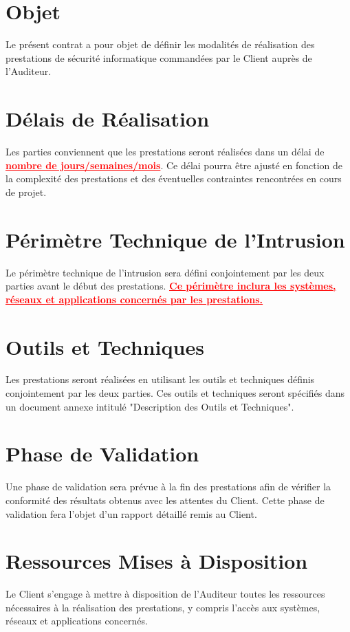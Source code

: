 \documentclass[12pt]{extarticle}
\begin{document}
\section{Objet}
Le présent contrat a pour objet de définir les modalités de réalisation des prestations de sécurité informatique commandées par le Client auprès de l'Auditeur.
\section{Délais de Réalisation}
Les parties conviennent que les prestations seront réalisées dans un délai de \textcolor{red}{\textbf{\underline{nombre de jours/semaines/mois}}}. Ce délai pourra être ajusté en fonction de la complexité des prestations et des éventuelles contraintes rencontrées en cours de projet.
\section{Périmètre Technique de l’Intrusion}
Le périmètre technique de l'intrusion sera défini conjointement par les deux parties avant le début des prestations. \textcolor{red}{\textbf{\underline{Ce périmètre inclura les systèmes, réseaux et applications concernés par les prestations.}}}
\section{Outils et Techniques}
Les prestations seront réalisées en utilisant les outils et techniques définis conjointement par les deux parties. Ces outils et techniques seront spécifiés dans un document annexe intitulé "Description des Outils et Techniques".
\section{Phase de Validation}
Une phase de validation sera prévue à la fin des prestations afin de vérifier la conformité des résultats obtenus avec les attentes du Client. Cette phase de validation fera l'objet d'un rapport détaillé remis au Client.
\section{Ressources Mises à Disposition}
Le Client s'engage à mettre à disposition de l'Auditeur toutes les ressources nécessaires à la réalisation des prestations, y compris l'accès aux systèmes, réseaux et applications concernés.
\end{document}
